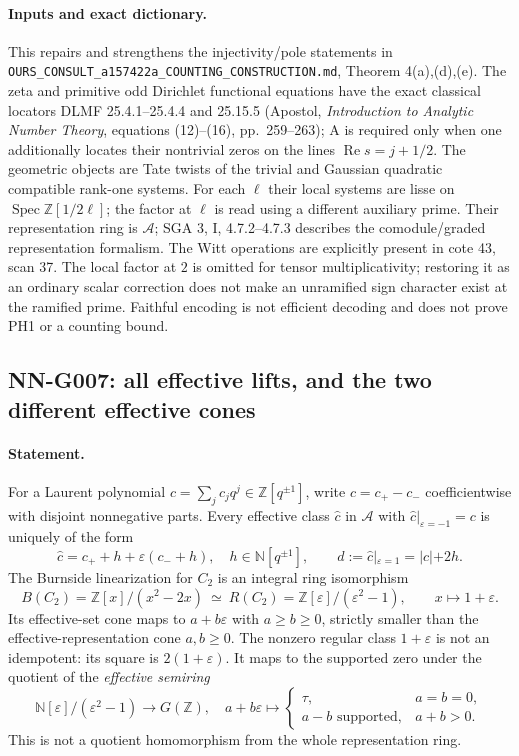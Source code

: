 \paragraph{Inputs and exact dictionary.}
This repairs and strengthens the injectivity/pole statements in
\texttt{OURS\_CONSULT\_a157422a\_COUNTING\_CONSTRUCTION.md},
Theorem 4(a),(d),(e). The zeta and primitive odd Dirichlet functional
equations have the exact classical locators DLMF 25.4.1--25.4.4
and 25.15.5 (Apostol, \emph{Introduction to Analytic Number
Theory}, equations (12)--(16), pp.\ 259--263); A is required only when
one additionally locates their nontrivial zeros on the lines
$\operatorname{Re}s=j+1/2$. The geometric objects are Tate twists
of the trivial and Gaussian quadratic compatible rank-one systems.
For each $\ell$ their local systems are lisse on
$\operatorname{Spec}\mathbb Z[1/2\ell]$; the factor at $\ell$
is read using a different auxiliary prime. Their representation
ring is $\mathcal A$; SGA 3, I, 4.7.2--4.7.3 describes the
comodule/graded representation formalism. The Witt operations
are explicitly present in cote 43, scan 37. The local factor at
$2$ is omitted for tensor multiplicativity; restoring it as an
ordinary scalar correction does not make an unramified sign
character exist at the ramified prime. Faithful encoding is not
efficient decoding and does not prove PH1 or a counting bound.

\subsection{NN-G007: all effective lifts, and the two different effective cones}
\paragraph{Statement.}
For a Laurent polynomial $c=\sum_j c_jq^j\in\mathbb Z[q^{\pm1}]$,
write $c=c_+-c_-$ coefficientwise with disjoint nonnegative parts.
Every effective class $\widehat c$ in $\mathcal A$ with
$\widehat c|_{\varepsilon=-1}=c$ is uniquely of the form
\[
 \widehat c=c_++h+\varepsilon(c_-+h),\quad
 h\in\mathbb N[q^{\pm1}],\qquad
 d:=\widehat c|_{\varepsilon=1}=|c|+2h.             \tag{G007.1}
\]
The Burnside linearization for $C_2$ is an integral ring
isomorphism
\[
 B(C_2)=\mathbb Z[x]/(x^2-2x)\ \simeq\
 R(C_2)=\mathbb Z[\varepsilon]/(\varepsilon^2-1),
 \qquad x\mapsto1+\varepsilon.                    \tag{G007.2}
\]
Its effective-set cone maps to $a+b\varepsilon$ with
$a\ge b\ge0$, strictly smaller than the effective-representation
cone $a,b\ge0$. The nonzero regular class $1+\varepsilon$ is not
an idempotent: its square is $2(1+\varepsilon)$. It maps to the
supported zero under the quotient of the \emph{effective semiring}
\[
 \mathbb N[\varepsilon]/(\varepsilon^2-1)\longrightarrow G(\mathbb Z),
 \quad a+b\varepsilon\longmapsto
 \begin{cases}\tau,&a=b=0,\\a-b\text{ supported},&a+b>0.\end{cases}
\]
This is not a quotient homomorphism from the whole representation ring.

